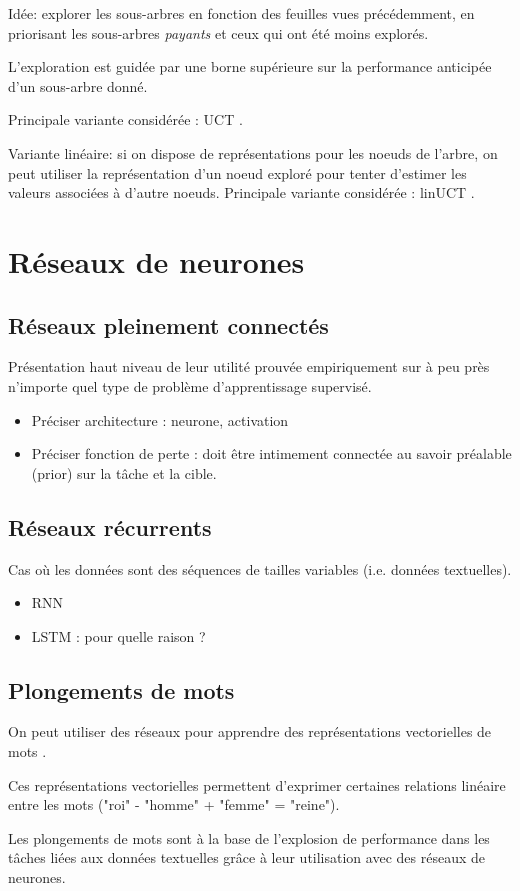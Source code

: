Idée: explorer les sous-arbres en fonction des feuilles vues précédemment,
en priorisant les sous-arbres \textit{payants} et ceux qui ont été
moins explorés.

L'exploration est guidée par une borne supérieure sur la performance anticipée
d'un sous-arbre donné.

Principale variante considérée : UCT \citep{10.5555/3020488.3020497}.

Variante linéaire: si on dispose de représentations pour les noeuds de
l'arbre, on peut utiliser la représentation d'un noeud exploré pour
tenter d'estimer les valeurs associées à d'autre noeuds.
Principale variante considérée : linUCT \citep{7860440}.

\section{Réseaux de neurones}

\subsection{Réseaux pleinement connectés}

Présentation haut niveau de leur utilité prouvée empiriquement
sur à peu près n'importe quel type de problème d'apprentissage
supervisé.
\begin{itemize}
    \item Préciser architecture : neurone, activation
    \item Préciser fonction de perte : doit être intimement connectée
          au savoir préalable (prior) sur la tâche et la cible.
\end{itemize}

\subsection{Réseaux récurrents}

Cas où les données sont des séquences de tailles variables (i.e. données
textuelles).

\begin{itemize}
    \item RNN
    \item LSTM : pour quelle raison ?
\end{itemize}

\subsection{Plongements de mots}

On peut utiliser des réseaux pour apprendre des représentations
vectorielles de mots \citep{NIPS2013_9aa42b31,pennington2014glove}.

Ces représentations vectorielles permettent d'exprimer certaines
relations linéaire entre les mots ("roi" - "homme" + "femme" = "reine").

Les plongements de mots sont à la base de l'explosion de performance dans les
tâches liées aux données textuelles grâce à leur utilisation avec des réseaux de
neurones.